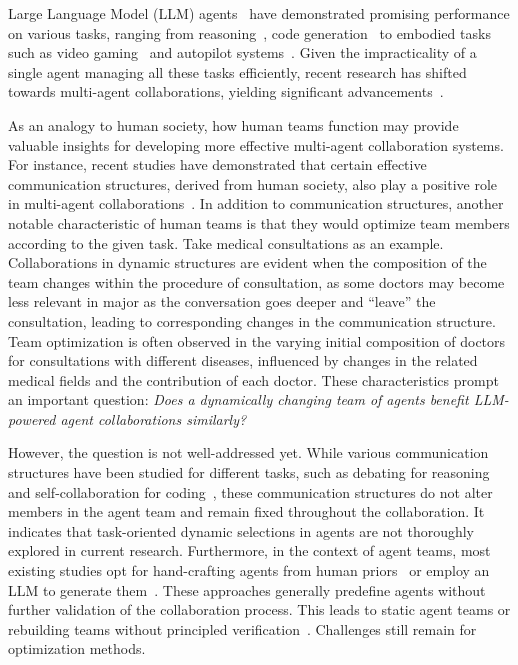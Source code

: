 \documentclass{article} %
\begin{document}
Large Language Model (LLM) agents~\citep{autogpt,babyagi,agentgpt} have demonstrated promising performance on various tasks, ranging from reasoning~\citep{yao2023react}, code generation~\citep{reflexion} to embodied tasks such as video gaming~\citep{voyager} and autopilot systems~\citep{jin2023surrealdriver}. Given the impracticality of a single agent managing all these tasks efficiently, recent research has shifted towards multi-agent collaborations, yielding significant advancements~\citep{li2023camel, debate1-mit, multi-persona, blender, reflexion, chen2023agentverse, autogen}.

As an analogy to human society, how human teams function may provide valuable insights for developing more effective multi-agent collaboration systems. For instance, recent studies have demonstrated that certain effective communication structures, derived from human society, also play a positive role in multi-agent collaborations~\citep{exchange-of-thought,chen2023agentverse}. In addition to communication structures, another notable characteristic of human teams is that they would optimize team members according to the given task. 
Take medical consultations as an example. 
Collaborations in dynamic structures are evident when the composition of the team changes within the procedure of consultation, as some doctors may become less relevant in major as the conversation goes deeper and ``leave'' the consultation, leading to corresponding changes in the communication structure. Team optimization is often observed in the varying initial composition of doctors for consultations with different diseases, influenced by changes in the related medical fields and the contribution of each doctor. These characteristics prompt an important question: \emph{{Does a dynamically changing team of agents benefit LLM-powered agent collaborations similarly?}} 

However, the question is not well-addressed yet. While various communication structures have been studied for different tasks, such as debating for reasoning~\citep{debate1-mit,debate2-thu,debate3-multi-models} and self-collaboration for coding~\citep{self-collab-codegen,software-dev,software-dev-2}, these communication structures do not alter members in the agent team and remain fixed throughout the collaboration. %
It indicates that task-oriented dynamic selections in agents are not thoroughly explored in current research. Furthermore, in the context of agent teams, most existing studies opt for hand-crafting agents from human priors~\citep{bolaa, babyagi, meta-gpt, reflexion, li2023camel} or employ an LLM to generate them~\citep{multi-persona,auto-agents,pangu-agent}. These approaches generally predefine agents without further validation of the collaboration process. This leads to static agent teams or rebuilding teams without principled verification~\citep{chen2023agentverse}. Challenges still remain for optimization methods. %
\end{document}
